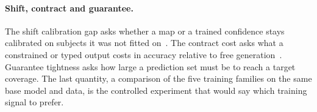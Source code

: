 \paragraph{Shift, contract and guarantee.} The shift calibration gap asks whether a map or a trained
confidence stays calibrated on subjects it was not fitted on~\citep{shen2024thermometer}. The contract
cost asks what a constrained or typed output costs in accuracy relative to free
generation~\citep{geng2025jsonschemabench,tam2024speak}. Guarantee tightness asks how large a prediction
set must be to reach a target coverage. The last quantity, a comparison of the five training families on
the same base model and data, is the controlled experiment that would say which training signal to prefer.
